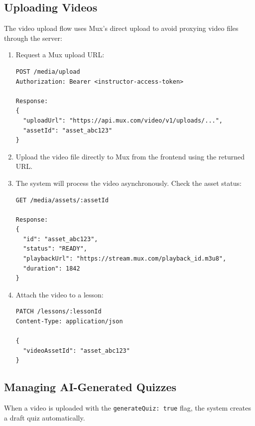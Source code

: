 \subsection{Uploading Videos}

The video upload flow uses Mux's direct upload to avoid proxying video files through the server:

\begin{enumerate}
  \item Request a Mux upload URL:

\begin{lstlisting}[caption=Request upload URL,label=lst:guide-upload-url]
POST /media/upload
Authorization: Bearer <instructor-access-token>

Response:
{
  "uploadUrl": "https://api.mux.com/video/v1/uploads/...",
  "assetId": "asset_abc123"
}
\end{lstlisting}

  \item Upload the video file directly to Mux from the frontend using the returned URL.
  \item The system will process the video asynchronously. Check the asset status:

\begin{lstlisting}[caption=Check video status,label=lst:guide-video-status]
GET /media/assets/:assetId

Response:
{
  "id": "asset_abc123",
  "status": "READY",
  "playbackUrl": "https://stream.mux.com/playback_id.m3u8",
  "duration": 1842
}
\end{lstlisting}

  \item Attach the video to a lesson:

\begin{lstlisting}[caption=Attach video to lesson,label=lst:guide-attach-video]
PATCH /lessons/:lessonId
Content-Type: application/json

{
  "videoAssetId": "asset_abc123"
}
\end{lstlisting}
\end{enumerate}

\subsection{Managing AI-Generated Quizzes}

When a video is uploaded with the \texttt{generateQuiz: true} flag, the system creates a draft quiz automatically.

